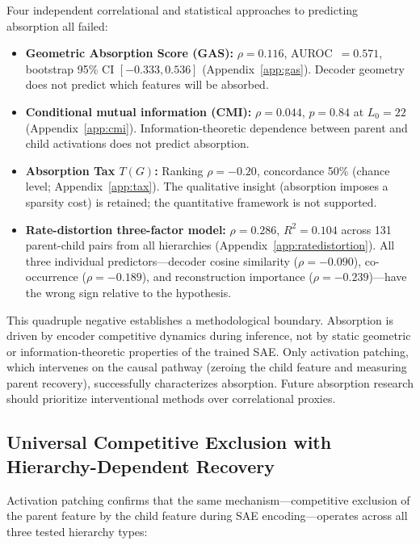 \documentclass{article}
\begin{document}
Four independent correlational and statistical approaches to predicting absorption all failed:

\begin{itemize}
\item \textbf{Geometric Absorption Score (GAS):} $\rho = 0.116$, AUROC~$= 0.571$, bootstrap 95\% CI $[-0.333, 0.536]$ (Appendix~\ref{app:gas}). Decoder geometry does not predict which features will be absorbed.

\item \textbf{Conditional mutual information (CMI):} $\rho = 0.044$, $p = 0.84$ at $L_0 = 22$ (Appendix~\ref{app:cmi}). Information-theoretic dependence between parent and child activations does not predict absorption.

\item \textbf{Absorption Tax $T(G)$:} Ranking $\rho = -0.20$, concordance 50\% (chance level; Appendix~\ref{app:tax}). The qualitative insight (absorption imposes a sparsity cost) is retained; the quantitative framework is not supported.

\item \textbf{Rate-distortion three-factor model:} $\rho = 0.286$, $R^2 = 0.104$ across 131 parent-child pairs from all hierarchies (Appendix~\ref{app:ratedistortion}). All three individual predictors---decoder cosine similarity ($\rho = -0.090$), co-occurrence ($\rho = -0.189$), and reconstruction importance ($\rho = -0.239$)---have the wrong sign relative to the hypothesis.
\end{itemize}

This quadruple negative establishes a methodological boundary. Absorption is driven by encoder competitive dynamics during inference, not by static geometric or information-theoretic properties of the trained SAE. Only activation patching, which intervenes on the causal pathway (zeroing the child feature and measuring parent recovery), successfully characterizes absorption. Future absorption research should prioritize interventional methods over correlational proxies.

\subsection{Universal Competitive Exclusion with Hierarchy-Dependent Recovery}

Activation patching confirms that the same mechanism---competitive exclusion of the parent feature by the child feature during SAE encoding---operates across all three tested hierarchy types:
\end{document}
